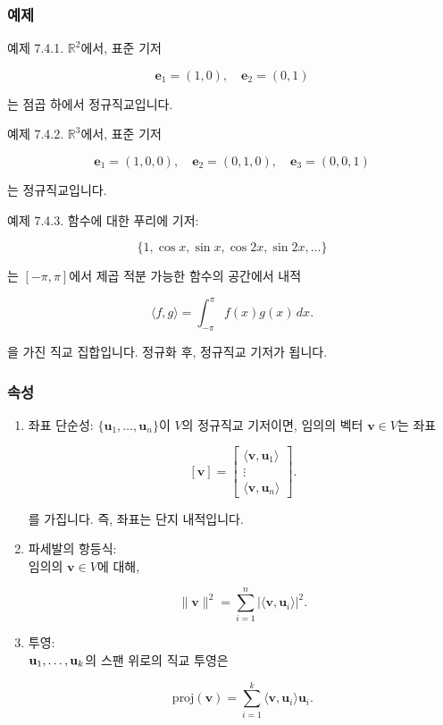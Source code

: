 \documentclass[
  12pt,
  a4paper,
]{article}
\begin{document}
\subsubsection{예제}\label{examples-7}

예제 7.4.1. \(\mathbb{R}^2\)에서, 표준 기저

\[\mathbf{e}_1 = (1,0), \quad \mathbf{e}_2 = (0,1)\]

는 점곱 하에서 정규직교입니다.

예제 7.4.2. \(\mathbb{R}^3\)에서, 표준 기저

\[\mathbf{e}_1 = (1,0,0), \quad \mathbf{e}_2 = (0,1,0), \quad \mathbf{e}_3 = (0,0,1)\]

는 정규직교입니다.

예제 7.4.3. 함수에 대한 푸리에 기저:

\[\{1, \cos x, \sin x, \cos 2x, \sin 2x, \dots\}\]

는 \([-\pi,\pi]\)에서 제곱 적분 가능한 함수의 공간에서 내적

\[\langle f,g \rangle = \int_{-\pi}^{\pi} f(x) g(x)\, dx.\]

을 가진 직교 집합입니다. 정규화 후, 정규직교 기저가 됩니다.

\subsubsection{속성}\label{properties}

\begin{enumerate}
\def\labelenumi{\arabic{enumi}.}
\item
  좌표 단순성: \(\{\mathbf{u}_1,\dots,\mathbf{u}_n\}\)이 \(V\)의 정규직교 기저이면, 임의의 벡터 \(\mathbf{v}\in V\)는 좌표

  \[[\mathbf{v}] = \begin{bmatrix} \langle \mathbf{v}, \mathbf{u}_1 \rangle \\ \vdots \\ \langle \mathbf{v}, \mathbf{u}_n \rangle \end{bmatrix}.\]

  를 가집니다. 즉, 좌표는 단지 내적입니다.
\item
  파세발의 항등식:\\
  임의의 \(\mathbf{v} \in V\)에 대해,

  \[\|\mathbf{v}\|^2 = \sum_{i=1}^n |\langle \mathbf{v}, \mathbf{u}_i \rangle|^2.\]
\item
  투영:\\
  \(\\{\mathbf{u}_1,\dots,\mathbf{u}_k\\}\)의 스팬 위로의 직교 투영은

  \[\text{proj}(\mathbf{v}) = \sum_{i=1}^k \langle \mathbf{v}, \mathbf{u}_i \rangle \mathbf{u}_i.\]
\end{enumerate}
\end{document}
